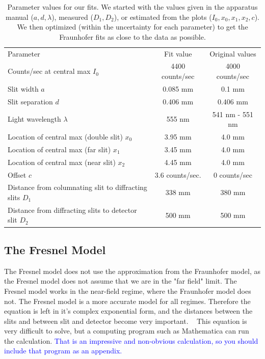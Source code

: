 \documentclass[prb,preprint]{revtex4-1}
\begin{document}
\begin{table}[h!]
\centering
\caption{Parameter values for our fits. We started with the values given in the apparatus manual ($a, d, \lambda$), measured ($D_1, D_2$), or estimated from the plots ($I_0, x_0, x_1, x_2, c$).  We then optimized (within the uncertainty for each parameter) to get the Fraunhofer fits as close to the data as possible. }
\begin{ruledtabular}
\begin{tabular}{lcc}
Parameter & Fit value & Original values      \\
Counts/sec at central max $I_0$     & 4400 counts/sec &  4000 counts/sec\\
Slit width $a$       & 0.085 mm        & 0.1 mm\\
Slit separation $d$       & 0.406 mm        & 0.406 mm\\
Light wavelength $\lambda$ & 555 nm          & 541 nm - 551 nm\\
Location of central max (double slit) $x_0$     & 3.95 mm         & 4.0 mm\\
Location of central max (far slit) $x_1$     & 3.45 mm & 4.0 mm\\
Location of central max (near slit) $x_2$ & 4.45 mm & 4.0 mm\\
Offset $c$       & 3.6 counts/sec. & 0 counts/sec\\
Distance from columnating slit to diffracting slits $D_1$     & 338 mm         & 380 mm\\
Distance from diffracting slits to detector slit $D_2$     & 500 mm         & 500 mm
\end{tabular}
\end{ruledtabular}
\label{parameters}
\end{table}

\subsection{The Fresnel Model}

The Fresnel model does not use the approximation from the Fraunhofer model, as the Fresnel model does not assume that we are in the "far field" limit.  The Fresnel model works in the near-field regime, where the Fraunhofer model does not.  The Fresnel model is a more accurate model for all regimes.
Therefore the equation is left in it's complex exponential form, and the distances between the slits and between slit and detector become very important.  ~\cite{wolfram} This equation is very difficult to solve, but a computing program such as Mathematica can run the calculation.  \textcolor{blue}{That is an impressive and non-obvious calculation, so you should include that program as an appendix.} 
\end{document}
